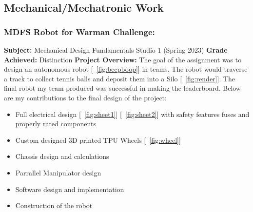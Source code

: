 \subsection{Mechanical/Mechatronic Work}

\subsubsection{MDFS Robot for Warman Challenge:}

\textbf{Subject: } Mechanical Design Fundamentals Studio 1 (Spring 2023) \newline
\textbf{Grade Achieved: } Distinction \newline
\textbf{Project Overview: }
The goal of the assignment was to design an autonomous robot [~\ref{fig:beepboop}] in teams. The robot would traverse a track to collect tennis balls and deposit them into a Silo [~\ref{fig:render}]. The final robot my team produced was successful in making the leaderboard.
Below are my contributions to the final design of the project:

\begin{itemize} 
    \item Full electrical design [~\ref{fig:sheet1}] [~\ref{fig:sheet2}] with safety features fuses and properly rated components
    \item Custom designed 3D printed TPU Wheels [~\ref{fig:wheel}]
    \item Chassis design and calculations
    \item Parrallel Manipulator design 
    \item Software design and implementation
    \item Construction of the robot
\end{itemize}

\newpage